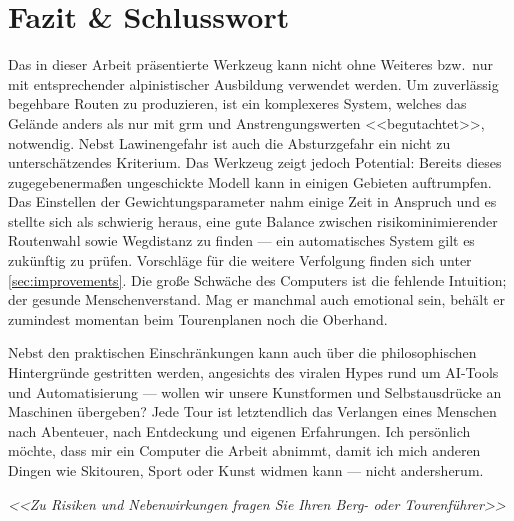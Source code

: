 \section{Fazit \& Schlusswort}

Das in dieser Arbeit präsentierte Werkzeug kann nicht ohne Weiteres bzw.\ nur mit entsprechender alpinistischer Ausbildung verwendet werden. Um zuverlässig begehbare Routen zu produzieren, ist ein komplexeres System, welches das Gelände anders als nur mit \gls{grm} und Anstrengungswerten <<begutachtet>>, notwendig. Nebst Lawinengefahr ist auch die Absturzgefahr ein nicht zu unterschätzendes Kriterium. Das Werkzeug zeigt jedoch Potential: Bereits dieses zugegebenermaßen ungeschickte Modell kann in einigen Gebieten auftrumpfen. Das Einstellen der Gewichtungsparameter nahm einige Zeit in Anspruch und es stellte sich als schwierig heraus, eine gute Balance zwischen risikominimierender Routenwahl sowie Wegdistanz zu finden --- ein automatisches System gilt es zukünftig zu prüfen. Vorschläge für die weitere Verfolgung finden sich unter \ref{sec:improvements}. Die große Schwäche des Computers ist die fehlende Intuition; der gesunde Menschenverstand. Mag er manchmal auch emotional sein, behält er zumindest momentan beim Tourenplanen noch die Oberhand. 

Nebst den praktischen Einschränkungen kann auch über die philosophischen Hintergründe gestritten werden, angesichts des viralen Hypes rund um AI-Tools und Automatisierung --- wollen wir unsere Kunstformen und Selbstausdrücke an Maschinen übergeben? Jede Tour ist letztendlich das Verlangen eines Menschen nach Abenteuer, nach Entdeckung und eigenen Erfahrungen. Ich persönlich möchte, dass mir ein Computer die Arbeit abnimmt, damit ich mich anderen Dingen wie Skitouren, Sport oder Kunst widmen kann --- nicht andersherum.

\large{
  \textit{<<Zu Risiken und Nebenwirkungen fragen Sie Ihren Berg- oder Tourenführer>>}
}